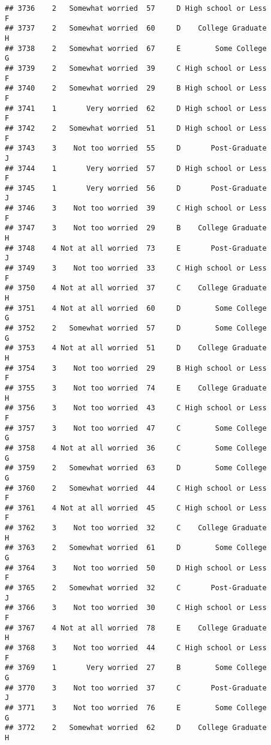 \documentclass[
]{article}
\begin{document}
\begin{verbatim}
## 3736    2   Somewhat worried  57     D High school or Less         F
## 3737    2   Somewhat worried  60     D    College Graduate         H
## 3738    2   Somewhat worried  67     E        Some College         G
## 3739    2   Somewhat worried  39     C High school or Less         F
## 3740    2   Somewhat worried  29     B High school or Less         F
## 3741    1       Very worried  62     D High school or Less         F
## 3742    2   Somewhat worried  51     D High school or Less         F
## 3743    3    Not too worried  55     D       Post-Graduate         J
## 3744    1       Very worried  57     D High school or Less         F
## 3745    1       Very worried  56     D       Post-Graduate         J
## 3746    3    Not too worried  39     C High school or Less         F
## 3747    3    Not too worried  29     B    College Graduate         H
## 3748    4 Not at all worried  73     E       Post-Graduate         J
## 3749    3    Not too worried  33     C High school or Less         F
## 3750    4 Not at all worried  37     C    College Graduate         H
## 3751    4 Not at all worried  60     D        Some College         G
## 3752    2   Somewhat worried  57     D        Some College         G
## 3753    4 Not at all worried  51     D    College Graduate         H
## 3754    3    Not too worried  29     B High school or Less         F
## 3755    3    Not too worried  74     E    College Graduate         H
## 3756    3    Not too worried  43     C High school or Less         F
## 3757    3    Not too worried  47     C        Some College         G
## 3758    4 Not at all worried  36     C        Some College         G
## 3759    2   Somewhat worried  63     D        Some College         G
## 3760    2   Somewhat worried  44     C High school or Less         F
## 3761    4 Not at all worried  45     C High school or Less         F
## 3762    3    Not too worried  32     C    College Graduate         H
## 3763    2   Somewhat worried  61     D        Some College         G
## 3764    3    Not too worried  50     D High school or Less         F
## 3765    2   Somewhat worried  32     C       Post-Graduate         J
## 3766    3    Not too worried  30     C High school or Less         F
## 3767    4 Not at all worried  78     E    College Graduate         H
## 3768    3    Not too worried  44     C High school or Less         F
## 3769    1       Very worried  27     B        Some College         G
## 3770    3    Not too worried  37     C       Post-Graduate         J
## 3771    3    Not too worried  76     E        Some College         G
## 3772    2   Somewhat worried  62     D    College Graduate         H

\end{verbatim}
\end{document}
